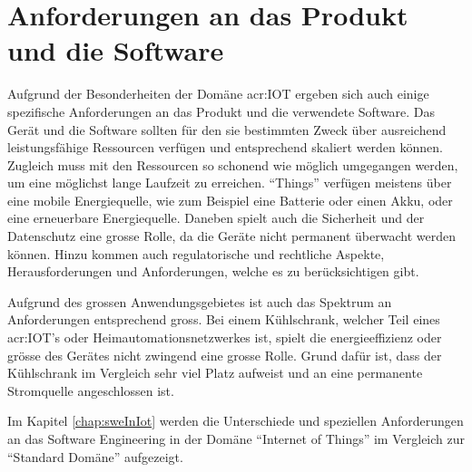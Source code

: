 \section{Anforderungen an das Produkt und die Software}
Aufgrund der Besonderheiten der Domäne \gls{acr:IOT} ergeben sich auch einige spezifische Anforderungen an das Produkt und die verwendete Software. Das Gerät und die Software sollten für den sie bestimmten Zweck über ausreichend leistungsfähige Ressourcen verfügen und entsprechend skaliert werden können.  Zugleich muss mit den Ressourcen so schonend wie möglich umgegangen werden, um eine möglichst lange Laufzeit zu erreichen. "`Things"' verfügen meistens über eine mobile Energiequelle, wie zum Beispiel eine Batterie oder einen Akku, oder eine erneuerbare Energiequelle. Daneben spielt auch die Sicherheit und der Datenschutz eine grosse Rolle, da die Geräte nicht permanent überwacht werden können. Hinzu kommen auch regulatorische und rechtliche Aspekte, Herausforderungen und Anforderungen, welche es zu berücksichtigen gibt.

Aufgrund des grossen Anwendungsgebietes ist auch das Spektrum an Anforderungen entsprechend gross. Bei einem Kühlschrank, welcher Teil eines \gls{acr:IOT}'s oder Heimautomationsnetzwerkes ist, spielt die energieeffizienz oder grösse des Gerätes nicht zwingend eine grosse Rolle. Grund dafür ist, dass der Kühlschrank im Vergleich sehr viel Platz aufweist und an eine permanente Stromquelle angeschlossen ist.

Im Kapitel \ref{chap:sweInIot}  werden die Unterschiede und speziellen Anforderungen an das Software Engineering in der Domäne "`Internet of Things"' im Vergleich zur "`Standard Domäne"' aufgezeigt.
